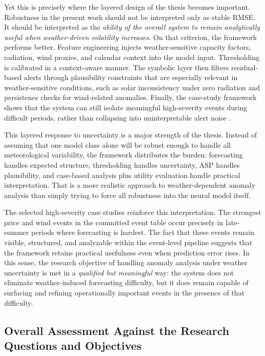 Yet this is precisely where the layered design of the thesis becomes important. Robustness in the present work should not be interpreted only as stable RMSE. It should be interpreted as the \emph{ability of the overall system to remain analytically useful when weather-driven volatility increases}. On that criterion, the framework performs better. Feature engineering injects weather-sensitive capacity factors, radiation, wind proxies, and calendar context into the model input. Thresholding is calibrated in a context-aware manner. The symbolic layer then filters residual-based alerts through plausibility constraints that are especially relevant in weather-sensitive conditions, such as solar inconsistency under zero radiation and persistence checks for wind-related anomalies. Finally, the case-study framework shows that the system can still isolate meaningful high-severity events during difficult periods, rather than collapsing into uninterpretable alert noise \cite{repo_thesis_grid_anomaly}.

This layered response to uncertainty is a major strength of the thesis. Instead of assuming that one model class alone will be robust enough to handle all meteorological variability, the framework distributes the burden: forecasting handles expected structure, thresholding handles uncertainty, ASP handles plausibility, and case-based analysis plus utility evaluation handle practical interpretation. That is a more realistic approach to weather-dependent anomaly analysis than simply trying to force all robustness into the neural model itself.

The selected high-severity case studies reinforce this interpretation. The strongest price and wind events in the committed event table occur precisely in late-summer periods where forecasting is hardest. The fact that these events remain visible, structured, and analyzable within the event-level pipeline suggests that the framework retains practical usefulness even when prediction error rises. In this sense, the research objective of handling anomaly analysis under weather uncertainty is met in a \emph{qualified but meaningful} way: the system does not eliminate weather-induced forecasting difficulty, but it does remain capable of surfacing and refining operationally important events in the presence of that difficulty.

\subsection{Overall Assessment Against the Research Questions and Objectives}

